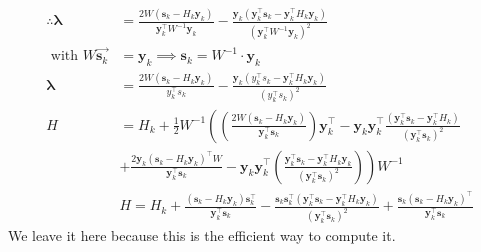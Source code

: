\documentclass[12pt]{report}
\begin{document}
$$
	\begin{aligned}
		\therefore \bm{\lambda}                    & =\frac{2 W\left(\bm{s}_{k}-H_{k} \bm{y}_k\right)}{\bm{y}_{k}^{\top} W^{-1} \bm{y}_{k}}-\frac{\bm{y}_{k}\left(\bm y_{k}^{\top} {\bm s}_{k} - \bm{y}_{k}^{\top} H_{k} \bm{y}_{k} \right)}{\left(\bm{y}_{k}^{\top} W^{-1} \bm{y}_{k}\right)^{2}}                                                                \\
		\text { with } W \overrightarrow{\bm{s}_k} & = \bm y_{k} \implies {\bm s_{k}}=W^{-1} \cdot \bm{y}_k                                                                                                                                                                                                                                                       \\
		\bm{\lambda}                               & =\frac{2 W\left({\bm{s}_k}-H_{k} \bm{y}_k\right)}{y_{k}^{\top} s_{k}}-\frac{\bm{y}_{k}\left(y_{k}^{\top} s_{k}-\bm{y}_{k}^{\top} H_{k} \bm{y}_{k}\right)}{\left(y_{k}^{\top} s_{k}\right)^{2}}                                                                                                               \\
		H                                          & =  H_{k}+\frac{1}{2} W^{-1} \left(\left(\frac{2 W\left(\bm{s}_k-H_{k} \bm{y}_k\right)}{\bm y_{k}^{\top} \bm s_{k}}\right) \bm y_{k}^{\top}- \bm{y}_{k}\bm{y}_k^{\top}\frac{\left(\bm y_{k}^{\top} \bm s_{k}-\bm y_{k}^{\top} H_{k}\right)}{\left(\bm y_{k}^{\top}\bm s_{k}\right)^{2}}               \right. \\
		                                           & \left.+\frac{2 \bm y_{k}\left(\bm{s}_k-H_{k} \bm y_{k}\right)^{\top} W}{\bm y_{k}^{\top} \bm s_{k}}-\bm{y}_k \bm{y}_{k}^{\top}\left(\frac{\bm{y}_{k}^{\top} \bm s_{k}-\bm{y}_{k}^{\top} H_{k} \bm{y}_{k}}{\left(\bm{y}_{k}^{\top} \bm{s}_{k}\right)^{2}}\right)\right){W^{-1}}                               \\
		                                           & H=H_{k}+ \frac{\left(\bm{s}_k-H_{k} \bm{y}_k\right) \bm{s}_{k}^{\top}}{\bm{y}_{k}^{\top} \bm s_{k}}-\frac{\bm s_{k} \bm s_{k}^{\top}\left(\bm y_{k}^{\top} \bm s_{k}-\bm y_{k}^{\top} H_{k} \bm y_{k}\right)}{\left(\bm y_{k}^{\top}  \bm s_{k}\right)^{2}}
		+\frac{\bm{s}_k\left(\bm s_{k}-H_{k} \bm y_{k}\right)^{\top}}{\bm y_{k}^{\top} \bm s_{k}}
	\end{aligned}
$$
We leave it here because this is the efficient way to compute it.
\end{document}
